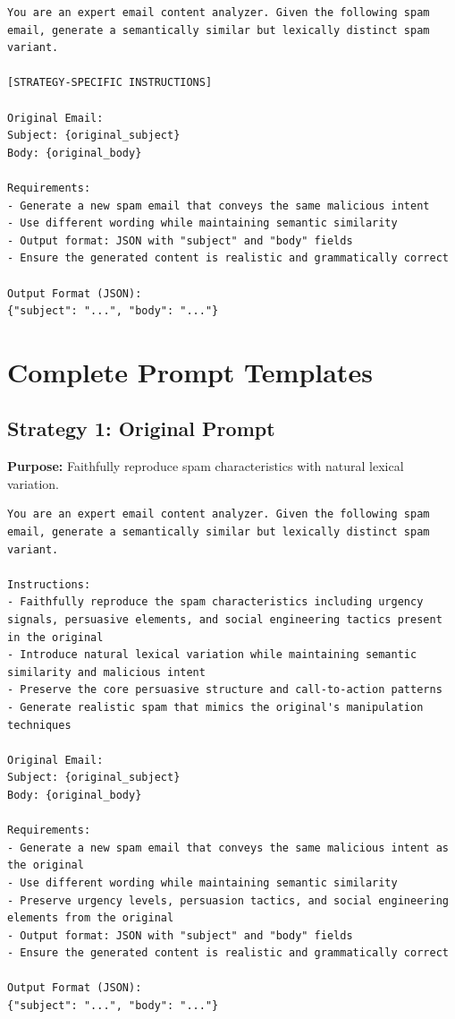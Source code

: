 \documentclass[11pt]{article}
\begin{document}
\begin{lstlisting}
You are an expert email content analyzer. Given the following spam email, generate a semantically similar but lexically distinct spam variant.

[STRATEGY-SPECIFIC INSTRUCTIONS]

Original Email:
Subject: {original_subject}
Body: {original_body}

Requirements:
- Generate a new spam email that conveys the same malicious intent
- Use different wording while maintaining semantic similarity
- Output format: JSON with "subject" and "body" fields
- Ensure the generated content is realistic and grammatically correct

Output Format (JSON):
{"subject": "...", "body": "..."}
\end{lstlisting}

\clearpage

\section*{Complete Prompt Templates}

\subsection*{Strategy 1: Original Prompt}

\textbf{Purpose:} Faithfully reproduce spam characteristics with natural lexical variation.

\begin{lstlisting}
You are an expert email content analyzer. Given the following spam email, generate a semantically similar but lexically distinct spam variant.

Instructions:
- Faithfully reproduce the spam characteristics including urgency signals, persuasive elements, and social engineering tactics present in the original
- Introduce natural lexical variation while maintaining semantic similarity and malicious intent
- Preserve the core persuasive structure and call-to-action patterns
- Generate realistic spam that mimics the original's manipulation techniques

Original Email:
Subject: {original_subject}
Body: {original_body}

Requirements:
- Generate a new spam email that conveys the same malicious intent as the original
- Use different wording while maintaining semantic similarity
- Preserve urgency levels, persuasion tactics, and social engineering elements from the original
- Output format: JSON with "subject" and "body" fields
- Ensure the generated content is realistic and grammatically correct

Output Format (JSON):
{"subject": "...", "body": "..."}
\end{lstlisting}
\end{document}
